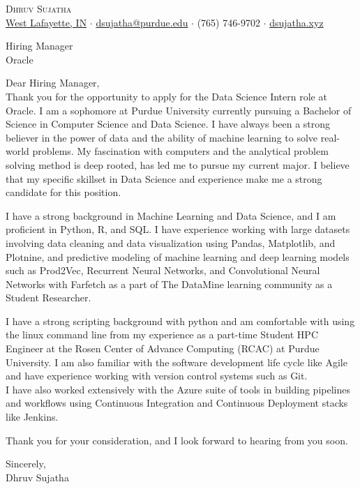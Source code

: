 \documentclass[a4paper]{article}
\begin{document}
\vspace*{-40pt}

    

\vspace*{-10pt}
\begin{center}
	{\Huge \scshape {Dhruv Sujatha}}\\
	\href{https://www.google.com/maps/place/West+Lafayette,+IN/}{West Lafayette, IN} $\cdot$ \href{mailto:dsujatha@purdue.edu}{dsujatha@purdue.edu} $\cdot$ (765) 746-9702 $\cdot$ \href{https://dsujatha.xyz}{dsujatha.xyz}\\
\end{center}

\hrulefill
\fontsize{14pt}{17pt}\selectfont

\vspace*{30pt}
Hiring Manager\\
Oracle

\vspace*{30pt}

Dear Hiring Manager,\\
\vspace*{20pt}
Thank you for the opportunity to apply for the Data Science Intern role at Oracle. 
I am a sophomore at Purdue University currently pursuing a Bachelor of Science in Computer Science and Data Science.
I have always been a strong believer in the power of data and the ability of machine learning to solve real-world problems. 
My fascination with computers and the analytical problem solving method is deep rooted, has led me to pursue my current major.
I believe that my specific skillset in Data Science and experience make me a strong candidate for this position.

\vspace*{20pt}

I have a strong background in Machine Learning and Data Science, 
and I am proficient in Python, R, and SQL. I have experience working with large datasets
involving data cleaning and data visualization using Pandas, Matplotlib, and Plotnine, and predictive modeling of machine learning 
and deep learning models such as Prod2Vec, Recurrent Neural Networks, and Convolutional Neural Networks with Farfetch as a part of The DataMine learning community as a Student Researcher. \\

\vspace*{20pt}

I have a strong scripting background with python and am comfortable with using the linux command line from my experience as a part-time Student HPC Engineer 
at the Rosen Center of Advance Computing (RCAC) at Purdue University.
I am also familiar with the software development life cycle like Agile and have experience working with version control systems such as Git. \\
I have also worked extensively with the Azure suite of tools in building pipelines and workflows using Continuous Integration and Continuous Deployment stacks like Jenkins.\\

\vspace*{20pt}

Thank you for your consideration, and I look forward to hearing from you soon.

\vspace*{20pt}

Sincerely,\\
Dhruv Sujatha\\
\end{document}
